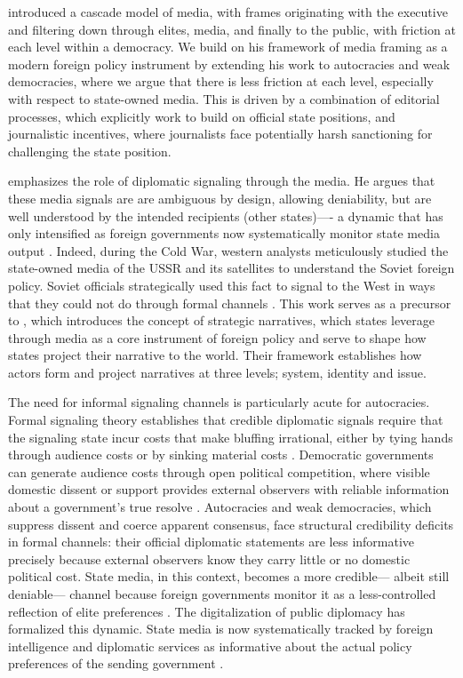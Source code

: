 \documentclass[12pt]{article}
\begin{document}
\citet{entman_projections_2004} introduced a cascade model of media, with frames originating with the executive and filtering down through elites, media, and finally to the public, with friction at each level within a democracy. We build on his framework of media framing as a modern foreign policy instrument by extending his work to autocracies and weak democracies, where we argue that there is less friction at each level, especially with respect to state-owned media. This is driven by a combination of editorial processes, which explicitly work to build on official state positions, and journalistic incentives, where journalists face potentially harsh sanctioning for challenging the state position.

\citet{cohen_theatre_1987} emphasizes the role of diplomatic signaling through the media. He argues that these media signals are are ambiguous by design, allowing deniability, but are well understood by the intended recipients (other states)---- a dynamic that has only intensified as foreign governments now systematically monitor state media output \citep{manor_digitalization_2019, bjola_revisiting_2018, usic_ic_2024}. Indeed, during the Cold War, western analysts meticulously studied the state-owned media of the USSR and its satellites to understand the Soviet foreign policy. Soviet officials strategically used this fact to signal to the West in ways that they could not do through formal channels \citep{cohen_theatre_1987}. This work serves as a precursor to \citet{miskimmon_strategic_2013}, which introduces the concept of strategic narratives, which states leverage through media as a core instrument of foreign policy and serve to shape how states project their narrative to the world. Their framework establishes how actors form and project narratives at three levels; system, identity and issue. 

The need for informal signaling channels is particularly acute for autocracies. Formal signaling theory establishes that credible diplomatic signals require that the signaling state incur costs that make bluffing irrational, either by tying hands through audience costs or by sinking material costs \citep{fearon_signaling_1997}. Democratic governments can generate audience costs through open political competition, where visible domestic dissent or support provides external observers with reliable information about a government's true resolve \citep{schultz_democracy_2001}. Autocracies and weak democracies, which suppress dissent and coerce apparent consensus, face structural credibility deficits in formal channels: their official diplomatic statements are less informative precisely because external observers know they carry little or no domestic political cost. State media, in this context, becomes a more credible--- albeit still deniable--- channel because foreign governments monitor it as a less-controlled reflection of elite preferences \citep{bjola_revisiting_2018}. The digitalization of public diplomacy has formalized this dynamic. State media is now systematically tracked by foreign intelligence and diplomatic services as informative about the actual policy preferences of the sending government \citep{manor_digitalization_2019, usic_ic_2024}.
\end{document}
